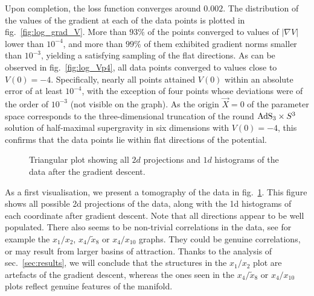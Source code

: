 \documentclass[11pt,a4paper]{article}
\begin{document}
	Upon completion, the loss function converges around $0.002$. The distribution of the values of the gradient at each of the data points is plotted in fig.~\ref{fig:log_grad_V}. More than $93\%$ of the points converged to values of $\vert\nabla V\vert$ lower than $10^{-4}$, and more than $99\%$ of them exhibited gradient norms smaller than $10^{-3}$, yielding a satisfying sampling of the flat directions. As can be observed in fig.~\ref{fig:log_Vp4}, all data points converged to values close to $V(0)=-4$. Specifically, nearly all points attained $V(0)$ within an absolute error of at least $10^{-4}$, with the exception of four points whose deviations were of the order of $10^{-3}$ (not visible on the graph). As the origin $\vec{X}=0$ of the parameter space corresponds to the three-dimensional truncation of the round ${\rm AdS}_{3}\times S^{3}$ solution of half-maximal supergravity in six dimensions with $V(0)=-4$, this confirms that the data points lie within flat directions of the potential.

	\begin{figure}
		\centering
		\caption{Triangular plot showing all $2d$ projections and $1d$ histograms of the data after the gradient descent.}
		\label{triangular_plot_1_2_4_8_10}
	\end{figure}
	
	As a first visualisation, we present a tomography of the data in fig.~\ref{triangular_plot_1_2_4_8_10}. This figure shows all possible 2d projections of the data, along with the 1d histograms of each coordinate after gradient descent. Note that all directions appear to be well populated. There also seems to be non-trivial correlations in the data, see for example the $x_1/x_2$, $x_4/\tilde{x}_8$ or $x_4/x_{10}$ graphs. They could be genuine correlations, or may result from larger basins of attraction. Thanks to the analysis of sec.~\ref{sec:results}, we will conclude that the structures in the $x_1/x_2$ plot are artefacts of the gradient descent, whereas the ones seen in the $x_4/\tilde{x}_8$ or $x_4/x_{10}$ plots reflect genuine features of the manifold. 
\end{document}
